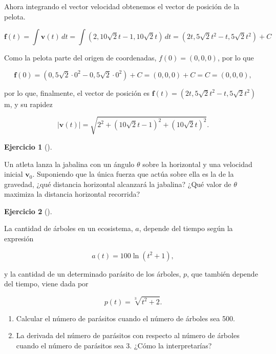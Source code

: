 \documentclass[
  spanish,
  a4paper,
]{scrreport}
\theoremstyle{definition}
\newtheorem{exercise}{Ejercicio}[chapter]
\theoremstyle{remark}
\begin{document}
\begin{tcolorbox}
Ahora integrando el vector velocidad obtenemos el vector de posición de
la pelota.

\[
\mathbf{f}(t)
= \int \mathbf{v}(t)\,dt 
= \int (2, 10\sqrt{2}t-1, 10\sqrt{2}t)\, dt 
= (2t, 5\sqrt{2}t^2-t, 5\sqrt{2}t^2) + C
\]

Como la pelota parte del origen de coordenadas, \(f(0)=(0,0,0)\), por lo
que

\[
\mathbf{f}(0) 
= (0, 5\sqrt{2}\cdot 0^2-0, 5\sqrt{2}\cdot 0^2) + C 
= (0, 0, 0) + C 
= C 
= (0, 0, 0), 
\]

por lo que, finalmente, el vector de posición es
\(\mathbf{f}(t)=(2t, 5\sqrt{2}t^2-t, 5\sqrt{2}t^2)\) m, y su rapidez

\[
|\mathbf{v}(t)| 
= \sqrt{2^2 + (10\sqrt{2}t-1)^2 + (10\sqrt{2}t)^2}.
\]

\end{tcolorbox}

\begin{exercise}[]\protect\hypertarget{exr-cinematica-jabalina}{}\label{exr-cinematica-jabalina}

Un atleta lanza la jabalina con un ángulo \(\theta\) sobre la horizontal
y una velocidad inicial \(\mathbf{v}_0\). Suponiendo que la única fuerza
que actúa sobre ella es la de la gravedad, ¿qué distancia horizontal
alcanzará la jabalina? ¿Qué valor de \(\theta\) maximiza la distancia
horizontal recorrida?

\end{exercise}

\begin{exercise}[]\protect\hypertarget{exr-parasitos}{}\label{exr-parasitos}

La cantidad de árboles en un ecosistema, \(a\), depende del tiempo según
la expresión

\[
a(t)=100\ln(t^2+1),
\]

y la cantidad de un determinado parásito de los árboles, \(p\), que
también depende del tiempo, viene dada por

\[
p(t) = \sqrt[3]{{t^2  + 2}}.
\]

\begin{enumerate}
\def\labelenumi{\alph{enumi}.}
\item
  Calcular el número de parásitos cuando el número de árboles sea 500.
\item
  La derivada del número de parásitos con respecto al número de árboles
  cuando el número de parásitos sea 3. ¿Cómo la interpretarías?
\end{enumerate}

\end{exercise}
\end{document}
